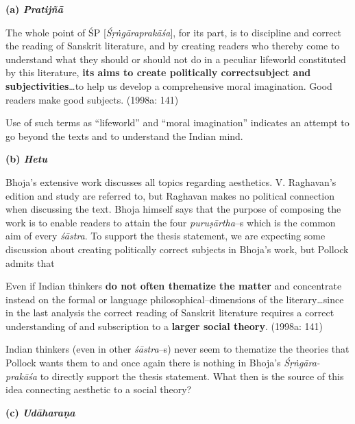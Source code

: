 
\textbf{(a) \textit{Pratijñā}}

\begin{myquote}
The whole point of ŚP [\textit{Śṛṅgāraprakāśa}], for its part, is to discipline and correct the reading of Sanskrit literature, and by creating readers who thereby come to understand what they should or should not do in a peculiar lifeworld constituted by this literature, \textbf{its aims to create politically correct}\textbf{subject and subjectivities}…to help us develop a comprehensive moral imagination. Good readers make good subjects. (1998a: 141)
\end{myquote}

Use of such terms as “lifeworld” and “moral imagination” indicates an attempt to go beyond the texts and to understand the Indian mind.

\textbf{(b) \textit{Hetu}}

Bhoja’s extensive work discusses all topics regarding aesthetics. V. Raghavan’s edition and study are referred to, but Raghavan makes no political connection when discussing the text. Bhoja himself says that the purpose of composing the work is to enable readers to attain the four \textit{puruṣārtha}–s which is the common aim of every \textit{śāstra}. To support the thesis statement, we are expecting some discussion about creating politically correct subjects in Bhoja’s work, but Pollock admits that

\begin{myquote}
Even if Indian thinkers \textbf{do not often thematize the matter} and concentrate instead on the formal or language philosophical–dimensions of the literary…since in the last analysis the correct reading of Sanskrit literature requires a correct understanding of and subscription to a \textbf{larger social theory}. (1998a: 141)
\end{myquote}

Indian thinkers (even in other \textit{śāstra}–s) never seem to thematize the theories that Pollock wants them to and once again there is nothing in Bhoja’s \textit{Śṛṅgāra-prakāśa} to directly support the thesis statement. What then is the source of this idea connecting aesthetic to a social theory?

\textbf{(c) \textit{Udāharaṇa}}

